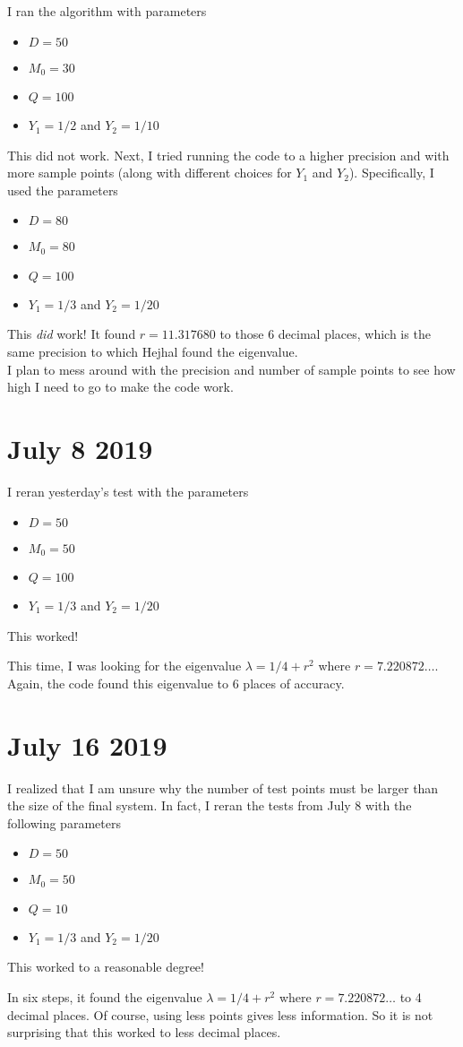 \documentclass[]{article}
\begin{document}
I ran the algorithm with parameters
\begin{itemize}
	\item $D = 50$
	\item $M_0 = 30$
	\item $Q = 100$
	\item $Y_1 = 1/2$ and $Y_2 = 1/10$
\end{itemize}
This did not work.
Next, I tried running the code to a higher precision and with more sample points (along with different choices for $Y_1$ and $Y_2$).
Specifically, I used the parameters
\begin{itemize}
	\item $D = 80$
	\item $M_0 = 80$
	\item $Q = 100$
	\item $Y_1 = 1/3$ and $Y_2 = 1/20$
\end{itemize}
This \textit{did} work!
It found $r = 11.317680$ to those $6$ decimal places, which is the same precision to which Hejhal found the eigenvalue.
\\

I plan to mess around with the precision and number of sample points to see how high I need to go to make the code work.

\section*{July 8 2019}

I reran yesterday's test with the parameters
\begin{itemize}
	\item $D = 50$
	\item $M_0 = 50$
	\item $Q = 100$
	\item $Y_1 = 1/3$ and $Y_2 = 1/20$
\end{itemize}
This worked!

This time, I was looking for the eigenvalue $\lambda = 1/4 + r^2$ where $r = 7.220872\dots$.
Again, the code found this eigenvalue to $6$ places of accuracy.

\section*{July 16 2019}

I realized that I am unsure why the number of test points must be larger than the size of the final system.
In fact, I reran the tests from July 8 with the following parameters
\begin{itemize}
	\item $D = 50$
	\item $M_0 = 50$
	\item $Q = 10$
	\item $Y_1 = 1/3$ and $Y_2 = 1/20$
\end{itemize}
This worked to a reasonable degree!

In six steps, it found the eigenvalue $\lambda = 1/4 + r^2$ where $r = 7.220872\dots$ to 4 decimal places.
Of course, using less points gives less information.
So it is not surprising that this worked to less decimal places.
	
\end{document}
